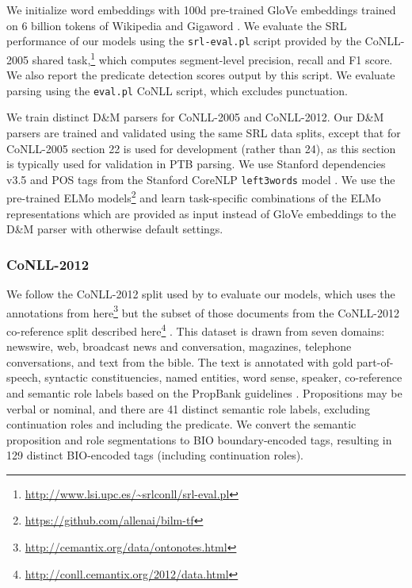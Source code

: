 \documentclass[11pt,a4paper]{article}
\begin{document}
We initialize word embeddings with 100d pre-trained GloVe embeddings trained on 6 billion tokens of Wikipedia and Gigaword \citep{pennington2014glove}. We evaluate the SRL performance of our models using the \texttt{srl-eval.pl} script provided by the CoNLL-2005 shared task,\footnote{\protect\url{http://www.lsi.upc.es/~srlconll/srl-eval.pl}} which computes segment-level precision, recall and F1 score. We also report the predicate detection scores output by this script. We evaluate parsing using the \texttt{eval.pl} CoNLL script, which excludes punctuation.

We train distinct D\&M parsers for CoNLL-2005 and CoNLL-2012. Our D\&M parsers are trained and validated using the same SRL data splits, except that for CoNLL-2005 section 22 is used for development (rather than 24), as this section is typically used for validation in PTB parsing. We use Stanford dependencies v3.5 \citep{deMarneffe2008} and POS tags from the Stanford CoreNLP \texttt{left3words} model \citep{toutanova2003feature}. We use the pre-trained ELMo models\footnote{\protect\url{https://github.com/allenai/bilm-tf}} and learn task-specific combinations of the ELMo representations which are provided as input instead of GloVe embeddings to the D\&M parser with otherwise default settings.

\subsubsection{CoNLL-2012}
We follow the CoNLL-2012 split used by \citet{he2018jointly} to evaluate our models, which uses the annotations from here\footnote{\protect\url{http://cemantix.org/data/ontonotes.html}} but the subset of those documents from the CoNLL-2012 co-reference split described here\footnote{\protect\url{http://conll.cemantix.org/2012/data.html}} \citep{pradhan2013towards}. This dataset is drawn from seven domains: newswire, web, broadcast news and conversation, magazines, telephone conversations, and text from the bible. The text is annotated with gold part-of-speech, syntactic constituencies, named entities, word sense, speaker, co-reference and semantic role labels based on the PropBank guidelines \citep{palmer2005proposition}. Propositions may be verbal or nominal, and there are 41 distinct semantic role labels, excluding continuation roles and including the predicate. We convert the semantic proposition and role segmentations to BIO boundary-encoded tags, resulting in 129 distinct BIO-encoded tags (including continuation roles). 
\end{document}
